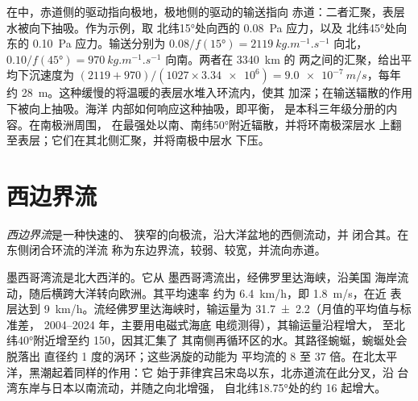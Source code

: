 在中，赤道侧的驱动指向极地，极地侧的驱动的输送指向
赤道：二者汇聚，表层水被向下抽吸。作为示例，取
北纬\ang{15}处向西的 \qty{0.08}{Pa} 应力，以及
北纬\ang{45}处向东的 \qty{0.10}{Pa} 应力。输送分别为
$0.08/f(\ang{15}) = \qty{2119}{kg.m^{-1}.s^{-1}}$ 向北，$0.10/f(\ang{45}) =
\qty{970}{kg.m^{-1}.s^{-1}}$ 向南。两者在 \qty{3340}{km} 的
两之间的汇聚，给出平均下沉速度为
$(2119 + 970)/(1027 \times \num{3.34e6}) = \qty{9.0e-7}{m/s}$，每年
约 \qty{28}{m}。这种缓慢的将温暖的表层水堆入环流内，使其
加深；在输送辐散的作用下被向上抽吸。海洋
内部如何响应这种抽吸，即平衡，
是本科三年级分册的内容。在南极洲周围，
在最强处以南、南纬\ang{50}附近辐散，并将环南极深层水
上翻至表层；它们在其北侧汇聚，并将南极中层水
下压。

\section{西边界流}\label{sec:b1:ocean-circulation:wbc}

\begin{definition}[西边界流]\label{def:b1:ocean-circulation:wbc}
\emph{西边界流}是一种快速的、
狭窄的向极流，沿大洋盆地的西侧流动，并
闭合其。在东侧闭合环流的洋流
称为东边界流，较弱、较宽，并流向赤道。
\end{definition}

墨西哥湾流是北大西洋的。它从
墨西哥湾流出，经佛罗里达海峡，沿美国
海岸流动，随后横跨大洋转向欧洲。其平均速率
约为 \qty{6.4}{km/h}，即 \qty{1.8}{m/s}，在近
表层达到 \qty{9}{km/h}。流经佛罗里达海峡时，输运量为
\qty[uncertainty-mode=separate]{31.7 \pm 2.2}{\sverdrup}（月值的平均值与标准差，
2004--2024 年，主要用电磁式海底
电缆测得），其输运量沿程增大，
至北纬\ang{40}附近增至约 \qty{150}{\sverdrup}，因其汇集了
其南侧再循环区的水。其路径蜿蜒，蜿蜒处会脱落出
直径约 1 度的涡环；这些涡旋的动能为
平均流的 8 至 37 倍。在北太平洋，黑潮起着同样的作用：它
始于菲律宾吕宋岛以东，北赤道流在此分叉，沿
台湾东岸与日本以南流动，并随之向北增强，
自北纬\ang{18.75}处的约 \qty{16}{\sverdrup} 起增大。


